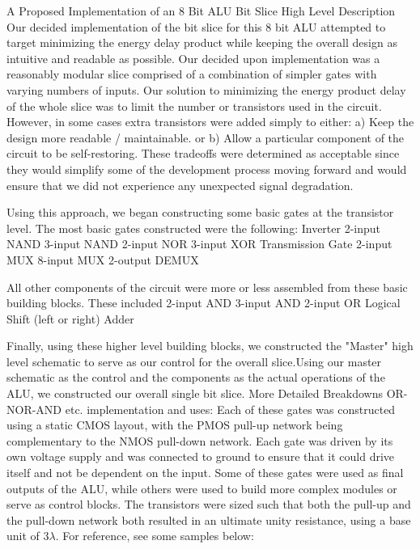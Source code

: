 \documentclass[12pt]{article}
\begin{document}
	A Proposed Implementation of an 8 Bit ALU Bit Slice
	\newline
	High Level Description
	\newline
	Our decided implementation of the bit slice for this 8 bit ALU attempted to target
	minimizing the energy delay product while keeping the overall design as intuitive and 
	readable as possible. Our decided upon implementation was a reasonably modular 
	slice comprised of a combination of simpler gates with varying numbers of inputs. Our
	solution to minimizing the energy product delay of the whole slice was to limit the number
	or transistors used in the circuit. However, in some cases extra transistors were added
	simply to either:
		a) Keep the design more readable / maintainable. 
		or
		b) Allow a particular component of the circuit to be self-restoring. 
	These tradeoffs were determined as acceptable since they would simplify some of the
	development process moving forward and would ensure that we did not experience any
	unexpected signal degradation. 
	
	Using this approach, we began constructing some basic gates at the transistor level. The most
	basic gates constructed were the following:
		Inverter
		2-input NAND
		3-input NAND
		2-input NOR
		3-input XOR
		Transmission Gate
		2-input MUX
		8-input MUX
		2-output DEMUX
	
	All other components of the circuit were more or less assembled from these basic building
	blocks. These included
		2-input AND
		3-input AND
		2-input OR
		Logical Shift (left or right)
		Adder
	
	Finally, using these higher level building blocks, we constructed the "Master" high level
	schematic to serve as our control for the overall slice.Using our master schematic as 
	the control and the components as the actual operations of the ALU, we constructed 
	our overall single bit slice. 
	\newline
	More Detailed Breakdowns
	\newline
	OR-NOR-AND etc. implementation and uses:
	Each of these gates was constructed using a static CMOS layout, with the PMOS pull-up 
	network being complementary to the NMOS pull-down network. Each gate was driven by
	its own voltage supply and was connected to ground to ensure that it could drive itself and
	not be dependent on the input. Some of these gates were used as final outputs of the ALU,
	while others were used to build more complex modules or serve as control blocks. The 
	transistors were sized such that both the pull-up and the pull-down network
	both resulted in an ultimate unity resistance, using a base unit of 3$\lambda$. 
	For reference, see some samples below:
	
\end{document}
